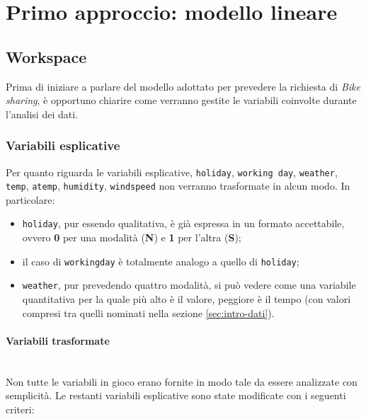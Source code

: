 \section{Primo approccio: modello lineare}

\subsection{Workspace}

Prima di iniziare a parlare del modello adottato per prevedere la richiesta di
\emph{Bike sharing}, è opportuno chiarire come verranno gestite le variabili
coinvolte durante l'analisi dei dati.

\subsubsection{Variabili esplicative}\label{sec:modlin-work-espl}
Per quanto riguarda le variabili esplicative, \texttt{holiday},
\texttt{working day}, \texttt{weather}, \texttt{temp}, \texttt{atemp},
\texttt{humidity}, \texttt{windspeed} non verranno trasformate in alcun modo.
In particolare:

\begin{itemize}
\item \texttt{holiday}, pur essendo qualitativa, è già espressa in un formato
  accettabile, ovvero \textbf{0} per una modalità (\textbf{N}) e \textbf{1}
  per l'altra (\textbf{S});
\item il caso di \texttt{workingday} è totalmente analogo a quello di
  \texttt{holiday};
\item \texttt{weather}, pur prevedendo quattro modalità, si può vedere come
  una variabile quantitativa per la quale più alto è il valore, peggiore è il
  tempo (con valori compresi tra quelli nominati nella sezione
  \ref{sec:intro-dati}).
\end{itemize}

\paragraph{Variabili trasformate} \mbox{}\\
Non tutte le variabili in gioco erano fornite in modo tale da essere
analizzate con semplicità.
Le restanti variabili esplicative sono state modificate con i seguenti criteri:

